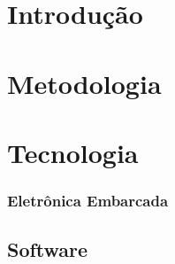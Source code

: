 % 



\chapter{Introdução} %


\chapter{Metodologia}


\chapter{Tecnologia}

\nocite{torres_2006}
\nocite{circuitar_2013}

\subsection{Eletrônica Embarcada} %


\section{Software} %

